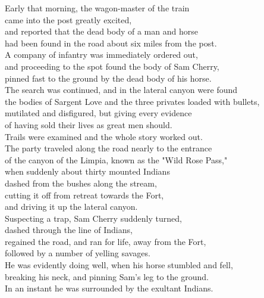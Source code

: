 
Early that morning, the wagon-master of the train\\
came into the post greatly excited,\\
and reported that the dead body of a man and horse\\
had been found in the road about six miles from the post.\\

A company of infantry was immediately ordered out,\\
and proceeding to the spot found the body of Sam Cherry,\\
pinned fast to the ground by the dead body of his horse.\\

The search was continued, and in the lateral canyon were found\\
the bodies of Sargent Love and the three privates loaded with bullets,\\
mutilated and disfigured, but giving every evidence\\
of having sold their lives as great men should.\\

Trails were examined and the whole story worked out.\\

The party traveled along the road nearly to the entrance\\
of the canyon of the Limpia, known as the "Wild Rose Pass,"\\
when suddenly about thirty mounted Indians\\
dashed from the bushes along the stream,\\
cutting it off from retreat towards the Fort,\\
and driving it up the lateral canyon.\\

Suspecting a trap, Sam Cherry suddenly turned,\\
dashed through the line of Indians,\\
regained the road, and ran for life, away from the Fort,\\
followed by a number of yelling savages.\\

He was evidently doing well, when his horse stumbled and fell,\\
breaking his neck, and pinning Sam's leg to the ground.\\
In an instant he was surrounded by the exultant Indians.\\

